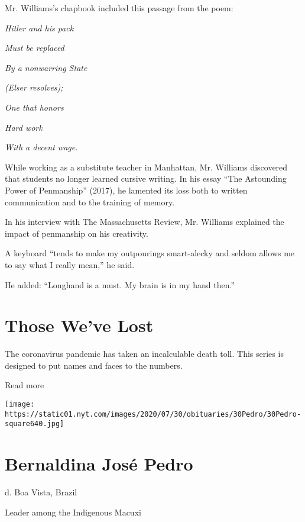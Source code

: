Mr. Williams's chapbook included this passage from the poem:

\emph{Hitler and his pack}

\emph{Must be replaced}

\emph{By a nonwarring State}

\emph{(Elser resolves);}

\emph{One that honors}

\emph{Hard work}

\emph{With a decent wage.}

While working as a substitute teacher in Manhattan, Mr. Williams
discovered that students no longer learned cursive writing. In his essay
``The Astounding Power of Penmanship'' (2017), he lamented its loss both
to written communication and to the training of memory.

In his interview with The Massachusetts Review, Mr. Williams explained
the impact of penmanship on his creativity.

A keyboard ``tends to make my outpourings smart-alecky and seldom allows
me to say what I really mean,'' he said.

He added: ``Longhand is a must. My brain is in my hand then.''

\href{https://www.nytimes.com/interactive/2020/obituaries/people-died-coronavirus-obituaries.html?action=click\&pgtype=Article\&state=default\&region=BELOW_MAIN_CONTENT\&context=covid_obits_promo}{}

\hypertarget{those-weve-lost}{%
\section{Those We've Lost}\label{those-weve-lost}}

The coronavirus pandemic has taken an incalculable death toll. This
series is designed to put names and faces to the numbers.

Read more

\texttt{[image: https://static01.nyt.com/images/2020/07/30/obituaries/30Pedro/30Pedro-square640.jpg]}

\hypertarget{bernaldina-josuxe9-pedro}{%
\section{Bernaldina José Pedro}\label{bernaldina-josuxe9-pedro}}

d. Boa Vista, Brazil

Leader among the Indigenous Macuxi

